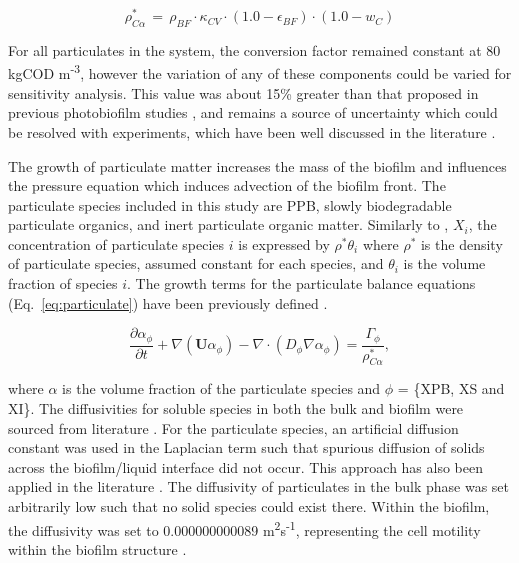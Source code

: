 \begin{equation}
    \label{eq:cod2alpha}
    \rho^*_{C\alpha} \, = \, \rho_{BF} \cdot \kappa_{CV} \cdot (1.0 - \epsilon_{BF}) \cdot (1.0 - w_C)
\end{equation}

For all particulates in the system, the conversion factor remained constant at 80 kgCOD m\textsuperscript{-3}, however the variation of any of these components could be varied for sensitivity analysis. This value was about 15\% greater than that proposed in previous photobiofilm studies \cite{polizzi2017}, and remains a source of uncertainty which could be resolved with experiments, which have been well discussed in the literature \cite{azeredo2017}. 

\skippingparagraph
The growth of particulate matter increases the mass of the biofilm and influences the pressure equation which induces advection of the biofilm front. The particulate species included in this study are PPB, slowly biodegradable particulate organics, and inert particulate organic matter. Similarly to \cite{alpkvist2007}, $X_i$, the concentration of particulate species $i$ is expressed by $\rho^*\theta_i$ where $\rho^*$ is the density of particulate species, assumed constant for each species, and $\theta_i$ is the volume fraction of species $i$. The growth terms for the particulate balance equations (Eq.~\ref{eq:particulate}) have been previously defined \cite{puyol2017}.


\begin{equation}
\label{eq:particulate}
\frac{\partial \alpha_{\phi}}{\partial t} + \nabla (\mathbf{U} \alpha_{\phi}) - \nabla \cdot (D_{\phi} \nabla \alpha_{\phi}) = \frac{\Gamma_{\phi}}{\rho^*_{C\alpha}}, 
\end{equation}

where $\alpha$ is the volume fraction of the particulate species and ${\phi}$ = \{XPB, XS and XI\}. The diffusivities for soluble species in both the bulk and biofilm were sourced from literature \cite{stewart2003, stewart1998}. For the particulate species, an artificial diffusion constant was used in the Laplacian term such that spurious diffusion of solids across the biofilm/liquid interface did not occur. This approach has also been applied in the literature \cite{haroun2010}. The diffusivity of particulates in the bulk phase was set arbitrarily low such that no solid species could exist there. Within the biofilm, the diffusivity was set to \num{0.000000000089} m\textsuperscript{2}s\textsuperscript{-1}, representing the cell motility within the biofilm structure \cite{ali2018}.  

